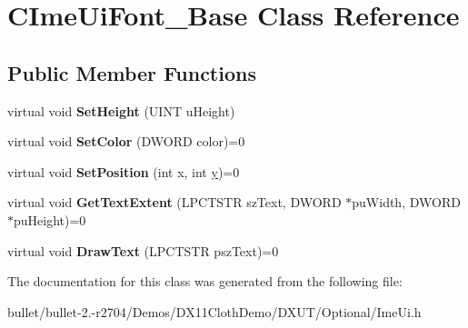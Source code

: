 \hypertarget{class_c_ime_ui_font___base}{\section{C\+Ime\+Ui\+Font\+\_\+\+Base Class Reference}
\label{class_c_ime_ui_font___base}
}
\subsection*{Public Member Functions}
\begin{DoxyCompactItemize}
\item 
\hypertarget{class_c_ime_ui_font___base_a0c85a84ea63410c625e31a040a66ab0d}{virtual void {\bfseries Set\+Height} (U\+I\+N\+T u\+Height)}\label{class_c_ime_ui_font___base_a0c85a84ea63410c625e31a040a66ab0d}

\item 
\hypertarget{class_c_ime_ui_font___base_a9f0ead26a715909ca038b93637afbfa3}{virtual void {\bfseries Set\+Color} (D\+W\+O\+R\+D color)=0}\label{class_c_ime_ui_font___base_a9f0ead26a715909ca038b93637afbfa3}

\item 
\hypertarget{class_c_ime_ui_font___base_aa8c3230baf2ec15d0b907d13e62c5fb5}{virtual void {\bfseries Set\+Position} (int x, int \hyperlink{_ice_utils_8h_aa7ffaed69623192258fb8679569ff9ba}{y})=0}\label{class_c_ime_ui_font___base_aa8c3230baf2ec15d0b907d13e62c5fb5}

\item 
\hypertarget{class_c_ime_ui_font___base_ab2eb54a89d4920619dd477b55731f747}{virtual void {\bfseries Get\+Text\+Extent} (L\+P\+C\+T\+S\+T\+R sz\+Text, D\+W\+O\+R\+D $\ast$pu\+Width, D\+W\+O\+R\+D $\ast$pu\+Height)=0}\label{class_c_ime_ui_font___base_ab2eb54a89d4920619dd477b55731f747}

\item 
\hypertarget{class_c_ime_ui_font___base_a5fd561622dd409e0aebec9d0b6cd6503}{virtual void {\bfseries Draw\+Text} (L\+P\+C\+T\+S\+T\+R psz\+Text)=0}\label{class_c_ime_ui_font___base_a5fd561622dd409e0aebec9d0b6cd6503}

\end{DoxyCompactItemize}


The documentation for this class was generated from the following file\+:\begin{DoxyCompactItemize}
\item 
bullet/bullet-\/2.-\/r2704/\+Demos/\+D\+X11\+Cloth\+Demo/\+D\+X\+U\+T/\+Optional/Ime\+Ui.\+h\end{DoxyCompactItemize}
